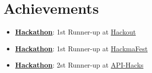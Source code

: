 \documentclass[letterpaper,11pt]{article}
\newcommand{\resumeItem}[1]{
  \item\small{
    {#1 \vspace{-2pt}}
  }
}
\newcommand{\resumeItemListStart}{\begin{itemize}}
\newcommand{\resumeItemListEnd}{\end{itemize}\vspace{-5pt}}
\begin{document}
\section{Achievements}
 \begin{itemize}[leftmargin=0.15in, label={}]
    \small{\item{
        \resumeItemListStart
                \resumeItem{\textbf{\href{Link if any}{Hackathon}}: 1st Runner-up at \href{https://www.hackout.io/}{Hackout}}
                \resumeItem{\textbf{\href{Link if any}{Hackathon}}: 1st Runner-up at \href{https://hackmafest.tech/}{HackmaFest}}
                \resumeItem{\textbf{\href{Link if any}{Hackathon}}: 2st Runner-up at \href{https://apihacks.co/}{API-Hacks}}
      \resumeItemListEnd
    }}
 \end{itemize}
\end{document}
